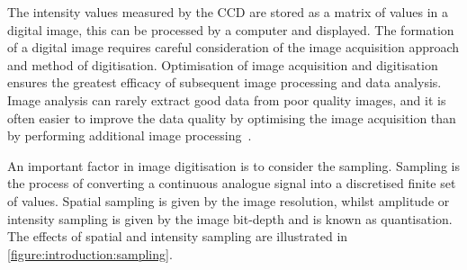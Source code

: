 The intensity values measured by the CCD are stored as a matrix of values in a digital image, this can be processed by a computer and displayed. The formation of a digital image requires careful consideration of the image acquisition approach and method of digitisation. Optimisation of image acquisition and digitisation ensures the greatest efficacy of subsequent image processing and data analysis. Image analysis can rarely extract good data from poor quality images, and it is often easier to improve the data quality by optimising the image acquisition than by performing additional image processing~\cite{Roeder2012}.

An important factor in image digitisation is to consider the sampling. Sampling is the process of converting a continuous analogue signal into a discretised finite set of values. Spatial sampling is given by the image resolution, whilst amplitude or intensity sampling is given by the image bit-depth and is known as quantisation. The effects of spatial and intensity sampling are illustrated in \autoref{figure:introduction:sampling}.

